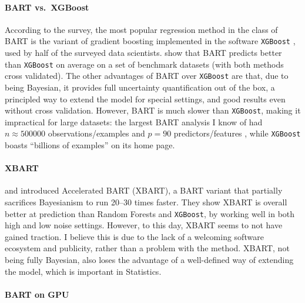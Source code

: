 \documentclass{article}
\begin{document}
    \paragraph{BART vs.\ XGBoost}

    According to the \citet[p.~35]{kaggle2021} survey, the most popular regression method in the class of BART is the variant of gradient boosting implemented in the software \texttt{XGBoost} \citep{chen2016}, used by half of the surveyed data scientists. \citet[table~2, p.~1105]{linero2018b} show that BART predicts better than \texttt{XGBoost} on average on a set of benchmark datasets (with both methods cross validated). The other advantages of BART over \texttt{XGBoost} are that, due to being Bayesian, it provides full uncertainty quantification out of the box, a principled way to extend the model for special settings, and good results even without cross validation. However, BART is much slower than \texttt{XGBoost}, making it impractical for large datasets: the largest BART analysis I know of had $n\approx\num{500000}$ observations/examples and $p=90$ predictors/features \citep{pratola2020}, while \texttt{XGBoost} boasts ``billions of examples'' on its home page.

    \paragraph{XBART}

    \citet{he2019} and \citet{he2021} introduced Accelerated BART (XBART), a BART variant that partially sacrifices Bayesianism to run 20--30 times faster. They show XBART is overall better at prediction than Random Forests and \texttt{XGBoost}, by working well in both high and low noise settings. However, to this day, XBART seems to not have gained traction. I believe this is due to the lack of a welcoming software ecosystem and publicity, rather than a problem with the method. XBART, not being fully Bayesian, also loses the advantage of a well-defined way of extending the model, which is important in Statistics.

    \paragraph{BART on GPU}
\end{document}
